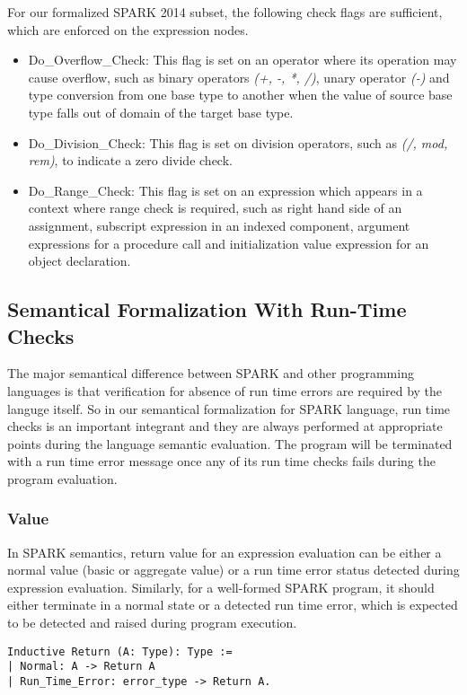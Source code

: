 For our formalized SPARK 2014 subset, the following check flags are sufficient,
which are enforced on the expression nodes.
\begin{itemize}
\item 
  Do\_Overflow\_Check: This flag is set on an operator where its operation may
  cause overflow, such as binary operators \textit{(+, -, *, /)}, unary operator
  \textit{(-)} and type conversion from one base type to another when the value
  of source base type falls out of domain of the target base type.
\item 
  Do\_Division\_Check: This flag is set on division operators, such as
  \textit{(/, mod, rem)}, to indicate a zero divide check.
\item 
  Do\_Range\_Check: This flag is set on an expression which appears in a
  context where range check is required, such as right hand side of an
  assignment, subscript expression in an indexed component, argument expressions
  for a procedure call and initialization value expression for an object
  declaration.
\end{itemize}

\subsection{Semantical Formalization With Run-Time Checks}
The major semantical difference between SPARK and other programming languages is
that verification for absence of run time errors are required by the languge
itself.
So in our semantical formalization for SPARK language, run time checks is an
important integrant and they are always performed at appropriate points during
the language semantic evaluation. The program will be terminated with a run time
error message once any of its run time checks fails during the program
evaluation.

\subsubsection{Value}
In SPARK semantics, return value for an expression evaluation can be either
a normal value (basic or aggregate value) or a run time error status detected
during expression evaluation.
Similarly, for a well-formed SPARK program, it should either terminate in a
normal state or a detected run time error, which is expected to be detected and
raised during program execution.

\begin{lstlisting}[escapechar=\#, language=coq, basicstyle=\small]
Inductive Return (A: Type): Type :=
| Normal: A -> Return A
| Run_Time_Error: error_type -> Return A.
\end{lstlisting}

